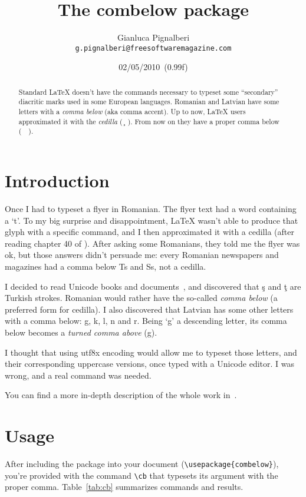 \documentclass{ltxdoc}
\begin{document}
\title{The \textsf{combelow} package}
\author{Gianluca Pignalberi\\\texttt{g.pignalberi@freesoftwaremagazine.com}}
\date{02/05/2010~(0.99f)}
\maketitle

\begin{abstract}
Standard \LaTeX{} doesn't have the commands necessary to typeset some
``secondary'' diacritic marks used in some European languages. Romanian and 
Latvian have some letters with a \emph{comma below} (aka comma accent). Up 
to now, \LaTeX{} users approximated it with the \emph{cedilla} (~\c{}~). From
now on they have a proper comma below (~\cb{}~).
\end{abstract}

\section{Introduction}
Once I had to typeset a flyer in Romanian. The flyer text had a word 
containing a `\cb t'. To my big surprise and disappointment, \LaTeX{} 
wasn't able to produce that glyph with a specific command, and I then 
approximated it with a cedilla (after reading chapter 40 of \cite{babel}).
After asking some Romanians, they told me the flyer was ok, but those answers
didn't persuade me: every Romanian newspapers and magazines had a comma below
Ts and Ss, not a cedilla.

I decided to read Unicode books and documents~\cite{Unitables,Ced}, and 
discovered that \c s and \c t are Turkish strokes. Romanian would rather have
the so-called \emph{comma below} (a preferred form for cedilla). I also 
discovered that Latvian has some other letters with a comma below: g, k, l, n
and r. Being `g' a descending letter, its comma below becomes a 
\emph{turned comma above} (\cb g).

I thought that using \textsf{utf8x} encoding would allow me to typeset those 
letters, and their corresponding uppercase versions, once typed with a 
Unicode editor. I was wrong, and a real command was needed.

You can find a more in-depth description of the whole work in~\cite{GP09}.

\section{Usage}
After including the package into your document 
(\verb+\usepackage{combelow}+), you're provided with the command \verb+\cb+
that typesets its argument with the proper comma. Table~\ref{tab:cb}
summarizes commands and results.
\end{document}

